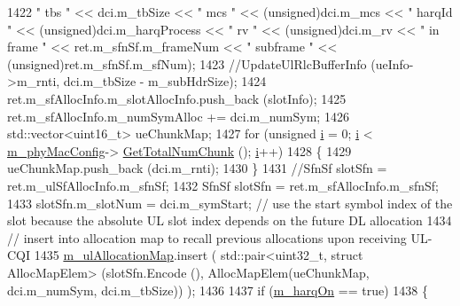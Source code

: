 \begin{DoxyCode}
1422                                                                                 \textcolor{stringliteral}{" tbs "} << dci.m\_tbSize << \textcolor{stringliteral}{
      " mcs "} << (\textcolor{keywordtype}{unsigned})dci.m\_mcs << \textcolor{stringliteral}{" harqId "} << (\textcolor{keywordtype}{unsigned})dci.m\_harqProcess << \textcolor{stringliteral}{" rv "} << (\textcolor{keywordtype}{unsigned})dci.m\_rv 
      << \textcolor{stringliteral}{" in frame "} << ret.m\_sfnSf.m\_frameNum << \textcolor{stringliteral}{" subframe "} << (\textcolor{keywordtype}{unsigned})ret.m\_sfnSf.m\_sfNum);
1423                         \textcolor{comment}{//UpdateUlRlcBufferInfo (ueInfo->m\_rnti, dci.m\_tbSize - m\_subHdrSize);}
1424                         ret.m\_sfAllocInfo.m\_slotAllocInfo.push\_back (slotInfo);
1425                         ret.m\_sfAllocInfo.m\_numSymAlloc += dci.m\_numSym;
1426                         std::vector<uint16\_t> ueChunkMap;
1427                         \textcolor{keywordflow}{for} (\textcolor{keywordtype}{unsigned} \hyperlink{bernuolliDistribution_8m_a6f6ccfcf58b31cb6412107d9d5281426}{i} = 0; \hyperlink{bernuolliDistribution_8m_a6f6ccfcf58b31cb6412107d9d5281426}{i} < \hyperlink{classns3_1_1MmWaveMacScheduler_a24d7af4971d2e500fe543cefbafa2fd9}{m\_phyMacConfig}->
      \hyperlink{classns3_1_1MmWavePhyMacCommon_a97e82c809a351fea9d5058ac1bb4c3c6}{GetTotalNumChunk} (); \hyperlink{bernuolliDistribution_8m_a6f6ccfcf58b31cb6412107d9d5281426}{i}++)
1428                         \{
1429                                 ueChunkMap.push\_back (dci.m\_rnti);
1430                         \}
1431                         \textcolor{comment}{//SfnSf slotSfn = ret.m\_ulSfAllocInfo.m\_sfnSf;}
1432                         SfnSf slotSfn = ret.m\_sfAllocInfo.m\_sfnSf;
1433                         slotSfn.m\_slotNum = dci.m\_symStart;  \textcolor{comment}{// use the start symbol index of the slot
       because the absolute UL slot index depends on the future DL allocation}
1434                         \textcolor{comment}{// insert into allocation map to recall previous allocations upon receiving UL-CQI}
1435                         \hyperlink{classns3_1_1MmWaveFlexTtiPfMacScheduler_af7da7cec8d296efb29a1fafc2a19bf48}{m\_ulAllocationMap}.insert ( std::pair<uint32\_t, struct
       AllocMapElem> (slotSfn.Encode (), AllocMapElem(ueChunkMap, dci.m\_numSym, dci.m\_tbSize)) );
1436 
1437                         \textcolor{keywordflow}{if} (\hyperlink{classns3_1_1MmWaveFlexTtiPfMacScheduler_ab7edfa7baaf0e2ce6c2ba43efc59e291}{m\_harqOn} == \textcolor{keyword}{true})
1438                         \{

\end{DoxyCode}
